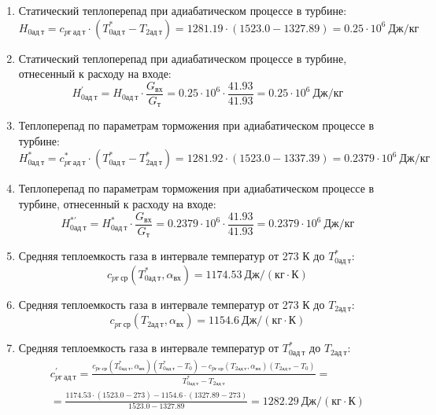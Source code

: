 \documentclass[a4paper,12pt]{article}
\begin{document}
\begin{enumerate}
        \item Статический теплоперепад при адиабатическом процессе в турбине:
        \[
            H_{0ад\ т} = c_{pг\ ад\ т} \cdot \left(
            T_{0ад\ т}^* - T_{2ад\ т}
            \right) =
            1281.19 \cdot \left(
            1523.0 - 1327.89
            \right) =
            0.25 \cdot 10^6 \ Дж/кг
        \]

        \item Статический теплоперепад при адиабатическом процессе в турбине, отнесенный к расходу на входе:
        \[
            H_{0ад\ т}^\prime = H_{0ад\ т} \cdot \frac{ G_{вх} }{ G_т }  =
                0.25 \cdot 10^6 \cdot
                \frac{ 41.93 }{ 41.93 } =
            0.25 \cdot 10^6 \ Дж/кг
        \]

        \item Теплоперепад по параметрам торможения при адиабатическом процессе в турбине:
        \[
            H_{0ад\ т}^* = c_{pг\ ад\ т}^* \cdot \left(
            T_{0ад\ т}^* - T_{2ад\ т}^*
            \right) =
            1281.92 \cdot \left(
            1523.0 - 1337.39
            \right) =
            0.2379 \cdot 10^6 \ Дж/кг
        \]

        \item Теплоперепад по параметрам торможения при адиабатическом процессе в турбине, отнесенный к расходу на входе:
        \[
            H_{0ад\ т}^{*\prime} = H_{0ад\ т}^* \cdot \frac{ G_{вх} }{ G_т }  =
                0.2379 \cdot 10^6 \cdot
                \frac{ 41.93 }{ 41.93 } =
            0.2379 \cdot 10^6 \ Дж/кг
        \]

        \item Средняя теплоемкость газа в интервале температур от 273 К до $T_{0ад\ т}^*$:
        \[
            c_{pг\ ср} (T_{0ад\ т}^*, \alpha_{вх}) =
            1174.53 \ Дж/(кг \cdot К)
        \]

        \item Средняя теплоемкость газа в интервале температур от 273 К до $T_{2ад\ т}$:
        \[
            c_{pг\ ср} (T_{2ад\ т}, \alpha_{вх}) =
            1154.6 \ Дж/(кг \cdot К)
        \]

        \item Средняя теплоемкость газа в интервале температур от $T_{0ад\ т}^*$ до $T_{2ад\ т}$:
        \begin{gather*}
            c_{pг\ ад\ т}^\prime = \frac{
		        c_{pг\ ср} (T_{0ад\ т}^*, \alpha_{вх}) (T_{0ад\ т}^* - T_0) - c_{pг\ ср} (T_{2ад\ т}, \alpha_{вх})(T_{2ад\ т} - T_0)
		    }{
		        T_{0ад\ т}^* - T_{2ад\ т}} =\\
            =\frac{
		        1174.53 \cdot
                (1523.0 - 273) -
		        1154.6 \cdot
                (1327.89 - 273)
		    }{
		        1523.0 - 1327.89} =
		    1282.29 \ Дж / (кг \cdot К)\\
        \end{gather*}


\end{enumerate}
\end{document}
